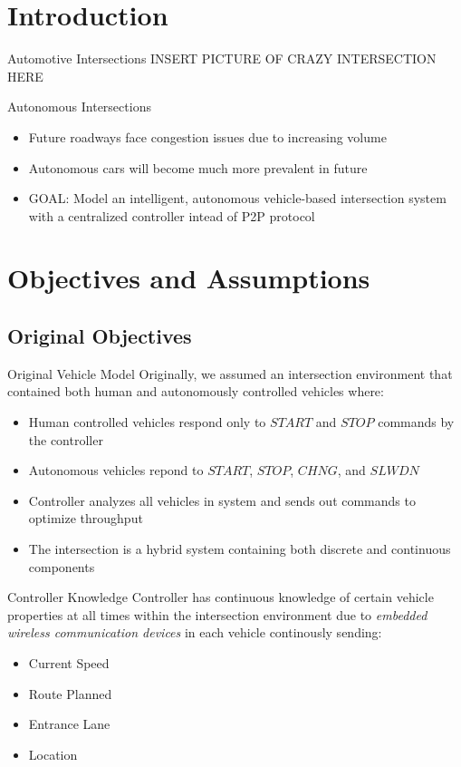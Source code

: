 \documentclass{beamer}
\begin{document}
\section{Introduction}

\begin{frame}{Automotive Intersections}
INSERT PICTURE OF CRAZY INTERSECTION HERE
\end{frame}

\begin{frame}{Autonomous Intersections}
\begin{itemize}
\item Future roadways face congestion issues due to increasing volume
\item Autonomous cars will become much more prevalent in future
\item GOAL: Model an intelligent, autonomous vehicle-based intersection system with a centralized controller intead of P2P protocol
\end{itemize}
\end{frame}

\section{Objectives and Assumptions}

\subsection{Original Objectives}

\begin{frame}{Original Vehicle Model}
Originally, we assumed an intersection environment that contained both
	human and autonomously controlled vehicles where:\\
\begin{itemize}
\item Human controlled vehicles respond only to $START$ and 
	$STOP$ commands by the controller
\item Autonomous vehicles repond to $START$, $STOP$, $CHNG$, and $SLWDN$
\item Controller analyzes all vehicles in system and sends out commands to 
	optimize throughput
\item The intersection is a hybrid system containing both discrete and continuous components
\end{itemize}
\end{frame}

\begin{frame}{Controller Knowledge}
Controller has continuous knowledge of certain vehicle properties at all times within the intersection environment due to 
	\emph{embedded wireless communication devices} in each vehicle continously sending:\\
\begin{itemize}
\item Current Speed
\item Route Planned
\item Entrance Lane
\item Location
\end{itemize}
\end{frame}
\end{document}
